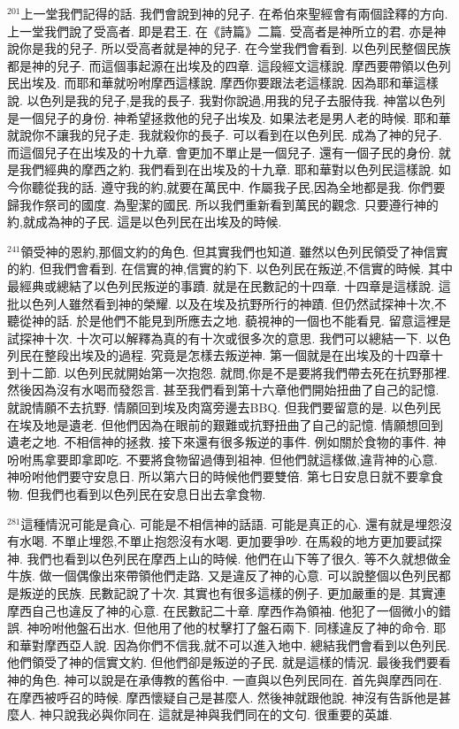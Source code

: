 \documentclass{book}
\begin{document}
$^{201}$上一堂我們記得的話.
我們會說到神的兒子.
在希伯來聖經會有兩個詮釋的方向.
上一堂我們說了受高者.
即是君王.
在《詩篇》二篇.
受高者是神所立的君.
亦是神說你是我的兒子.
所以受高者就是神的兒子.
在今堂我們會看到.
以色列民整個民族都是神的兒子.
而這個事起源在出埃及的四章.
這段經文這樣說.
摩西要帶領以色列民出埃及.
而耶和華就吩咐摩西這樣說.
摩西你要跟法老這樣說.
因為耶和華這樣說.
以色列是我的兒子,是我的長子.
我對你說過,用我的兒子去服侍我.
神當以色列是一個兒子的身份.
神希望拯救他的兒子出埃及.
如果法老是男人老的時候.
耶和華就說你不讓我的兒子走.
我就殺你的長子.
可以看到在以色列民.
成為了神的兒子.
而這個兒子在出埃及的十九章.
會更加不單止是一個兒子.
還有一個子民的身份.
就是我們經典的摩西之約.
我們看到在出埃及的十九章.
耶和華對以色列民這樣說.
如今你聽從我的話.
遵守我的約,就要在萬民中.
作屬我子民,因為全地都是我.
你們要歸我作祭司的國度.
為聖潔的國民.
所以我們重新看到萬民的觀念.
只要遵行神的約,就成為神的子民.
這是以色列民在出埃及的時候.

$^{241}$領受神的恩約,那個文約的角色.
但其實我們也知道.
雖然以色列民領受了神信實的約.
但我們會看到.
在信實的神,信實的約下.
以色列民在叛逆,不信實的時候.
其中最經典或總結了以色列民叛逆的事蹟.
就是在民數記的十四章.
十四章是這樣說.
這批以色列人雖然看到神的榮耀.
以及在埃及抗野所行的神蹟.
但仍然試探神十次,不聽從神的話.
於是他們不能見到所應去之地.
藐視神的一個也不能看見.
留意這裡是試探神十次.
十次可以解釋為真的有十次或很多次的意思.
我們可以總結一下.
以色列民在整段出埃及的過程.
究竟是怎樣去叛逆神.
第一個就是在出埃及的十四章十到十二節.
以色列民就開始第一次抱怨.
就問,你是不是要將我們帶去死在抗野那裡.
然後因為沒有水喝而發怨言.
甚至我們看到第十六章他們開始扭曲了自己的記憶.
就說情願不去抗野.
情願回到埃及肉窩旁邊去BBQ.
但我們要留意的是.
以色列民在埃及地是遺老.
但他們因為在眼前的艱難或抗野扭曲了自己的記憶.
情願想回到遺老之地.
不相信神的拯救.
接下來還有很多叛逆的事件.
例如關於食物的事件.
神吩咐馬拿要即拿即吃.
不要將食物留過傳到祖神.
但他們就這樣做,違背神的心意.
神吩咐他們要守安息日.
所以第六日的時候他們要雙倍.
第七日安息日就不要拿食物.
但我們也看到以色列民在安息日出去拿食物.

$^{281}$這種情況可能是貪心.
可能是不相信神的話語.
可能是真正的心.
還有就是埋怨沒有水喝.
不單止埋怨,不單止抱怨沒有水喝.
更加要爭吵.
在馬殺的地方更加要試探神.
我們也看到以色列民在摩西上山的時候.
他們在山下等了很久.
等不久就想做金牛族.
做一個偶像出來帶領他們走路.
又是違反了神的心意.
可以說整個以色列民都是叛逆的民族.
民數記說了十次.
其實也有很多這樣的例子.
更加嚴重的是.
其實連摩西自己也違反了神的心意.
在民數記二十章.
摩西作為領袖.
他犯了一個微小的錯誤.
神吩咐他盤石出水.
但他用了他的杖擊打了盤石兩下.
同樣違反了神的命令.
耶和華對摩西亞人說.
因為你們不信我,就不可以進入地中.
總結我們會看到以色列民.
他們領受了神的信實文約.
但他們卻是叛逆的子民.
就是這樣的情況.
最後我們要看神的角色.
神可以說是在承傳教的舊俗中.
一直與以色列民同在.
首先與摩西同在.
在摩西被呼召的時候.
摩西懷疑自己是甚麼人.
然後神就跟他說.
神沒有告訴他是甚麼人.
神只說我必與你同在.
這就是神與我們同在的文句.
很重要的英雄.
\end{document}
